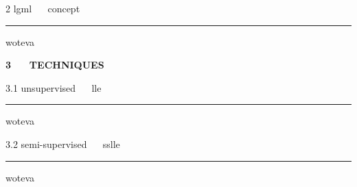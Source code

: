 \documentclass[11pt, compress, t, notes = noshow, xcolor = table, 
aspectratio = 1610]{beamer}
\newcommand{\highlight}[1]{\textcolor{highlightcol}{\textbf{#1}}}
\begin{document}

\LARGE
\begin{frame}{\textcolor{gray!90}{2 lgml} ~~ concept}
\normalsize
\vspace{-0.5cm}
\noindent \textcolor{gray!90}{\rule{\textwidth}{1pt}}


\medskip

woteva

\end{frame}


\begin{frame}{}

\Huge
\hspace{0pt}
\vfill
\textbf{\highlight{3 ~~ TECHNIQUES}}
\vfill
\hspace{0pt}

\end{frame}


\LARGE
\begin{frame}{\textcolor{gray!90}{3.1 unsupervised} ~~ lle}
\normalsize
\vspace{-0.5cm}
\noindent \textcolor{gray!90}{\rule{\textwidth}{1pt}}


\medskip

woteva

\end{frame}


\LARGE
\begin{frame}{\textcolor{gray!90}{3.2 semi-supervised} ~~ sslle}
\normalsize
\vspace{-0.5cm}
\noindent \textcolor{gray!90}{\rule{\textwidth}{1pt}}


\medskip

woteva

\end{frame}

\end{document}
